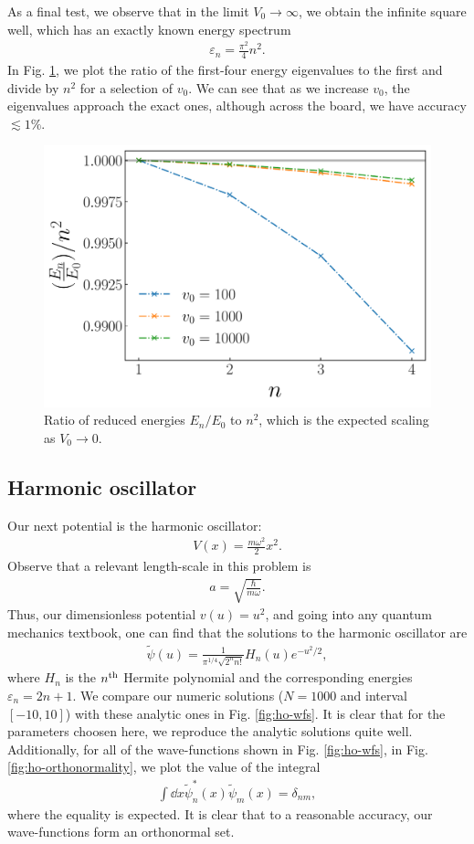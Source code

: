 As a final test, we observe that in the limit $V_0 \rightarrow \infty$, we obtain the infinite square well, which has an exactly known energy spectrum
\begin{align}
    \varepsilon_{n} = \frac{\pi^2}{4} n^2
.\end{align}
In Fig. \ref{fig:finite-well-spectrum}, we plot the ratio of the first-four energy eigenvalues to the first and divide by $n^2$ for a selection of $v_0$.
We can see that as we increase $v_0$, the eigenvalues approach the exact ones, although across the board, we have accuracy $\lesssim 1\%$.

\begin{figure}[h!tb]
    \centering
    \includegraphics[width=0.5\linewidth]{finite_well_spectrum.pdf}
    \caption{Ratio of reduced energies $E_{n}/E_0$ to $n^2$, which is the expected scaling as $V_0 \rightarrow 0$.}
    \label{fig:finite-well-spectrum}
\end{figure}


\subsection{Harmonic oscillator}
\label{ssec:harmonic-oscillator}

Our next potential is the harmonic oscillator:
\begin{align}
    V(x) = \frac{m \omega^2}{2} x^2
.\end{align}
Observe that a relevant length-scale in this problem is
\begin{align}
    a = \sqrt{\frac{\hbar}{m \omega}}
.\end{align}
Thus, our dimensionless potential $v(u) = u^2$, and going into any quantum mechanics textbook, one can find that the solutions to the harmonic oscillator are
\begin{align}
    \tilde{\psi}(u) = \frac{1}{\pi^{1/4} \sqrt{2^{n} n!}} H_{n}(u) e^{-u^2 / 2}
,\end{align}
where $H_{n}$ is the $n^{\rm th}$ Hermite polynomial and the corresponding energies $\varepsilon_n = 2n + 1$.
We compare our numeric solutions ($N = 1000$ and interval $[-10,10]$) with these analytic ones in Fig. \ref{fig:ho-wfs}.
It is clear that for the parameters choosen here, we reproduce the analytic solutions quite well.
Additionally, for all of the wave-functions shown in Fig. \ref{fig:ho-wfs}, in Fig. \ref{fig:ho-orthonormality}, we plot the value of the integral
\begin{align}
    \int \dd{x} \tilde{\psi}_{n}^{*}(x) \tilde{\psi}_{m}(x) = \delta_{nm}
,\end{align}
where the equality is expected.
It is clear that to a reasonable accuracy, our wave-functions form an orthonormal set.

